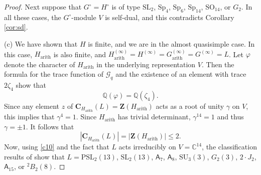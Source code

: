 \documentclass[11pt]{amsart}
\theoremstyle{plain}
\theoremstyle{definition}
\numberwithin{thm}{section}
\numberwithin{equation}{thm}
\newcommand{\Aut}{\mathrm{Aut}}
\newcommand{\SL}{\mathrm{SL}}
\newcommand{\PSL}{\mathrm{PSL}}
\newcommand{\SU}{\mathrm{SU}}
\newcommand{\Sp}{\mathrm{Sp}}
\newcommand{\SO}{\mathrm{SO}}
\newcommand{\sG}{{\mathcal G}}
\newcommand{\C}{{\mathbb C}}
\newcommand{\Q}{{\mathbb Q}}
\newcommand{\R}{{\mathbb R}}
\newcommand{\0}{\emptyset}
\newcommand{\ZB}{{\mathbf Z}}
\newcommand{\CB}{{\mathbf C}}
\newcommand{\ABS}{\mathsf{A}}
\newcommand{\ari}{{\mathrm {arith}}}
\newcommand{\tw}[1]{{}^#1\!}
\begin{document}
\begin{proof}
Next suppose that $G^\circ=H^\circ$ is of type $\SL_2$, $\Sp_4$, $\Sp_6$, $\Sp_{14}$, $\SO_{14}$, or $G_2$. In all these cases, 
the $G^\circ$-module $V$ is self-dual, and this contradicts Corollary \ref{cor:sd}.
%

\smallskip
(c) We have shown that $H$ is finite, and we are in the almost quasisimple case. In this case, $H_{\ari}$ is also finite, and
$H_{\ari}^{(\infty)} = H^{(\infty)} = G_{\ari}^{(\infty)} = G^{(\infty)} = L$. Let $\varphi$ denote the character of $H_{\ari}$ in the 
underlying representation $V$. Then the formula for the trace function of 
$\sG_q$ and the existence of an element with trace
$2\zeta_4$ show that 
\begin{equation}\label{c10}
  \Q(\varphi)=\Q(\zeta_4). 
\end{equation}
Since any element $z$ of $\CB_{H_{\ari}}(L)=\ZB(H_{\ari})$ acts as a root of unity 
$\gamma$ on $V$, this implies that $\gamma^4=1$. Since $H_{\ari}$ has trivial determinant, $\gamma^{14}=1$
and thus $\gamma = \pm 1$. It follows that 
\begin{equation}\label{c11}
  |\CB_{H_{\ari}}(L)| = |\ZB(H_{\ari})| \leq 2.
\end{equation}  
Now, using \eqref{c10} and the fact that $L$ acts irreducibly on $V = \C^{14}$, the classification 
results of \cite{HM} show that $L = \PSL_2(13)$, $\SL_2(13)$, $\ABS_7$, $\ABS_8$, $\SU_3(3)$, $G_2(3)$, $2\cdot J_2$, 
$\ABS_{15}$, or $\tw2 B_2(8)$.


\end{proof}
\end{document}
